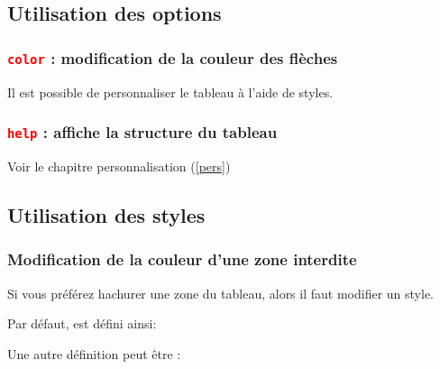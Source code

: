 \subsection{Utilisation des options}

\subsubsection{\texttt{\textcolor{red}{color}} : modification de la couleur des flèches}
Il est possible de personnaliser le tableau à l'aide de styles.
\begin{tkzexample}
\end{tkzexample} 
 
\subsubsection{\texttt{\textcolor{red}{help}} : affiche la structure du tableau} 
Voir le chapitre personnalisation (\ref{pers})
\subsection{Utilisation des styles}
 
\subsubsection{Modification de la couleur d'une zone interdite}
Si vous préférez hachurer une zone du tableau, alors  il faut modifier un style. 

Par défaut,   est défini ainsi:
\begin{tkzexample} 
\end{tkzexample}

Une autre définition peut être :

\begin{tkzexample}
\end{tkzexample}

